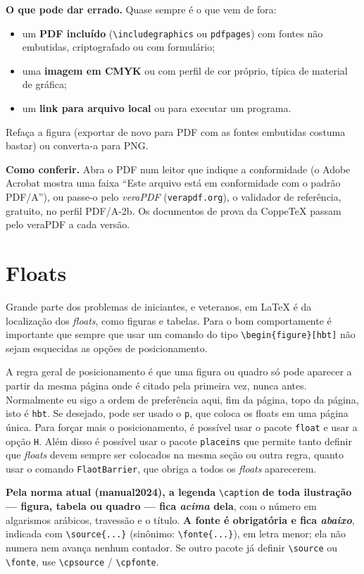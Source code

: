 \documentclass[dsc,setavermelha,numeracaoporcapitulo,linhanafolhaderosto]{ufrj}
\theoremstyle{plain}
\theoremstyle{definition}
\theoremstyle{remark}
\begin{document}
\textbf{O que pode dar errado.} Quase sempre é o que vem de fora:
\begin{itemize}
  \item um \textbf{PDF incluído} (\verb|\includegraphics| ou \verb|pdfpages|) com fontes não embutidas, criptografado ou com formulário;
  \item uma \textbf{imagem em CMYK} ou com perfil de cor próprio, típica de material de gráfica;
  \item um \textbf{link para arquivo local} ou para executar um programa.
\end{itemize}
Refaça a figura (exportar de novo para PDF com as fontes embutidas costuma bastar) ou converta-a para PNG.

\textbf{Como conferir.} Abra o PDF num leitor que indique a conformidade (o Adobe Acrobat mostra uma faixa ``Este arquivo está em conformidade com o padrão PDF/A''), ou passe-o pelo \emph{veraPDF} (\texttt{verapdf.org}), o validador de referência, gratuito, no perfil PDF/A-2b. Os documentos de prova da CoppeTeX passam pelo veraPDF a cada versão.

\chapter{Floats}

Grande parte dos problemas de iniciantes, e veteranos, em \LaTeX{} é da localização dos \textit{floats}, como figuras e tabelas. Para o bom comportamente é importante que sempre que usar um comando do tipo \verb*|\begin{figure}[hbt]| não sejam esquecidas as opções de posicionamento.

A regra geral de posicionamento é que uma figura ou quadro só pode aparecer a partir da mesma página onde é citado pela primeira vez, nunca antes. Normalmente eu sigo a ordem de preferência aqui, fim da página, topo da página, isto é \verb*|hbt|. Se desejado, pode ser usado o \verb*|p|, que coloca os floats em uma página única. Para forçar mais o posicionamento, é possível usar o pacote \verb*|float| e usar a opção \verb*|H|. Além disso é possível usar o pacote \verb*|placeins| que permite tanto definir que \textit{floats} devem sempre ser colocados na mesma seção ou outra regra, quanto usar o comando \verb*|FlaotBarrier|, que obriga a todos os \textit{floats} aparecerem.

\textbf{Pela norma atual (manual2024), a legenda} \verb|\caption| \textbf{de toda ilustração --- figura, tabela ou quadro --- fica \emph{acima} dela}, com o número em algarismos arábicos, travessão e o título. \textbf{A fonte é obrigatória e fica \emph{abaixo}}, indicada com \verb|\source{...}| (sinônimo: \verb|\fonte{...}|), em letra menor; ela não numera nem avança nenhum contador. Se outro pacote já definir \verb|\source| ou \verb|\fonte|, use \verb|\cpsource| / \verb|\cpfonte|.
\end{document}
